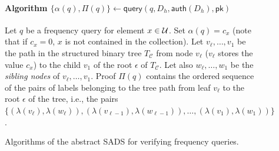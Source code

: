 \begin{figure}[ht!]
{{{\paragraph{\textbf{Algorithm} $\{\alpha(q),\Pi(q)\}\leftarrow\mathsf{query}(q,D_h,\mathsf{auth}(D_h),\mathsf{pk})$} Let $q$ be a frequency query for element $x\in {\cal U}$. Set $\alpha(q)=c_x$ (note that if $c_x=0$, $x$ is not contained in the collection). Let $v_{\ell},\ldots,v_1$ be the path in the structured binary tree $T_{\mathcal{C}}$ from node $v_{\ell}$ ($v_{\ell}$ stores the value $c_x$) to the child $v_1$ of the root $\epsilon$ of $T_{\mathcal{C}}$. Let also $w_{\ell},\ldots,w_1$ be the \emph{sibling nodes} of $v_{\ell},\ldots,v_1$. Proof $\Pi(q)$ contains the ordered sequence of the pairs of labels belonging to the tree path from leaf $v_\ell$ to the root $\epsilon$ of the tree, i.e., the pairs $\{(\lambda(v_{\ell}),\lambda(w_{\ell})),(\lambda(v_{\ell-1}),\lambda(w_{\ell-1})),\ldots,(\lambda(v_{1}),\lambda(w_{1}))\}$.
}}}
{\centering
{}}
{}
\caption{\label{algorithms_sads}Algorithms of the abstract SADS for verifying frequency queries.}
\end{figure}



